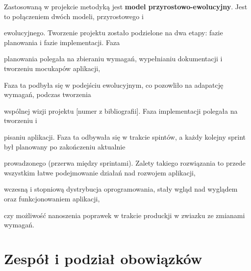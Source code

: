 \indent
Zastosowaną w projekcie metodyką jest \textbf{model przyrostowo-ewolucyjny}.
Jest to połączeniem dwóch modeli, przyrostowego i

ewolucyjnego. Tworzenie projektu zostało podzielone na dwa etapy: fazie planowania i fazie implementacji. Faza

planowania polegała na zbieraniu wymagań, wypełnianiu dokumentacji i tworzeniu mocukapów aplikacji,

Faza ta podbyła się w podejściu ewolucyjnym, co pozowliło na adapatcję wymagań, podczas tworzenia

wspólnej wizji projektu [numer z bibliografii]. Faza implementacji polegała na tworzeniu i

pisaniu aplikacji. Faza ta odbywała się w trakcie spintów, a każdy kolejny sprint był planowany po zakończeniu aktualnie

prowadzonego (przerwa między sprintami). Zalety takiego rozwiązania to przede wszystkim łatwe podejmowanie działań nad rozwojem aplikacji,

wczesną i stopniową dystrybucja oprogramowania, stały wgląd nad wyglądem oraz funkcjonowaniem aplikacji,

czy możliwość nanoszenia poprawek w trakcie produckji w zwiazku ze zmianami wymagań.

\section{Zespół i podział obowiązków}




